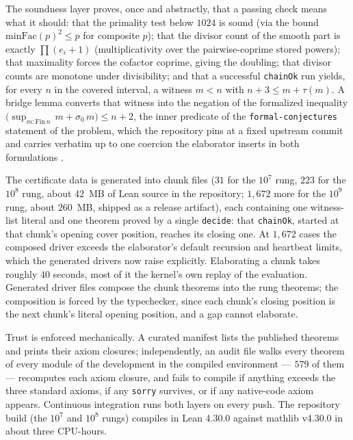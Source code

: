 \documentclass[11pt]{article}
\newcommand{\tdiv}{\tau}
\newcommand{\lean}[1]{\texttt{#1}}
\begin{document}
The soundness layer proves, once and abstractly, that a passing check
means what it should: that the primality test below $1024$ is sound
(via the bound $\mathrm{minFac}(p)^2 \le p$ for composite $p$); that
the divisor count of the smooth part is exactly $\prod (e_i+1)$
(multiplicativity over the pairwise-coprime stored powers); that
maximality forces the cofactor coprime, giving the doubling; that
divisor counts are monotone under divisibility; and that a successful
\lean{chainOk} run yields, for every $n$ in the covered interval, a
witness $m < n$ with $n + 3 \le m + \tdiv(m)$. A bridge lemma converts
that witness into the negation of the formalized inequality
$\bigl(\sup_{m : \mathrm{Fin}\, n}\, m + \sigma_0\, m\bigr) \le n + 2$,
the inner predicate of the \lean{formal-conjectures} statement of the
problem, which the repository pins at a fixed upstream commit and
carries verbatim up to one coercion the elaborator inserts in both
formulations \cite{formalconjectures}.

The certificate data is generated into chunk files ($31$ for the $10^7$
rung, $223$ for the $10^8$ rung, about $42$~MB of Lean source in the
repository; $1{,}672$ more for the $10^9$ rung, about $260$~MB, shipped
as a release artifact), each containing one witness-list literal and
one theorem proved by a single \lean{decide}: that \lean{chainOk},
started at that chunk's opening cover position, reaches its closing
one. At $1{,}672$ cases the composed driver exceeds the elaborator's
default recursion and heartbeat limits, which the generated drivers now
raise explicitly. Elaborating a chunk takes roughly $40$ seconds, most
of it the kernel's own replay of the evaluation. Generated driver files
compose the chunk theorems into the rung theorems; the composition is
forced by the typechecker, since each chunk's closing position is the
next chunk's literal opening position, and a gap cannot elaborate.

Trust is enforced mechanically. A curated manifest lists the published
theorems and prints their axiom closures; independently, an audit file
walks every theorem of every module of the development in the compiled
environment --- $579$ of them --- recomputes each axiom closure, and
fails to compile if anything exceeds the three standard axioms, if any
\lean{sorry} survives, or if any native-code axiom appears. Continuous
integration runs both layers on every push. The repository build (the
$10^7$ and $10^8$ rungs) compiles in Lean 4.30.0 against mathlib
v4.30.0 in about three CPU-hours.
\end{document}
